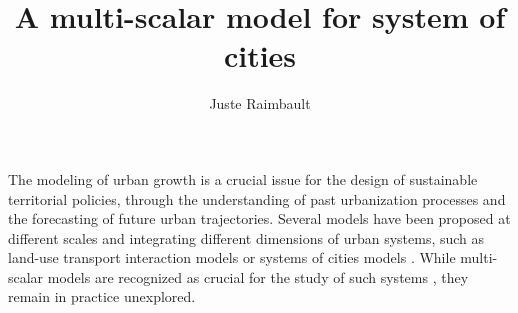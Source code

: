 \documentclass[11pt, a4paper]{article}
\begin{document}
\title{\vspace{-3.0cm}\large\textbf{A multi-scalar model for system of cities}}

\author[1,2,3]{\footnotesize Juste Raimbault}
\date{\vspace{-5ex}}

\maketitle
\thispagestyle{empty}

\noindent


The modeling of urban growth is a crucial issue for the design of sustainable territorial policies, through the understanding of past urbanization processes and the forecasting of future urban trajectories. Several models have been proposed at different scales and integrating different dimensions of urban systems, such as land-use transport interaction models \cite{wegener2004land} or systems of cities models \cite{pumain2017urban}. While multi-scalar models are recognized as crucial for the study of such systems \cite{Rozenblat2018}, they remain in practice unexplored.
\end{document}

